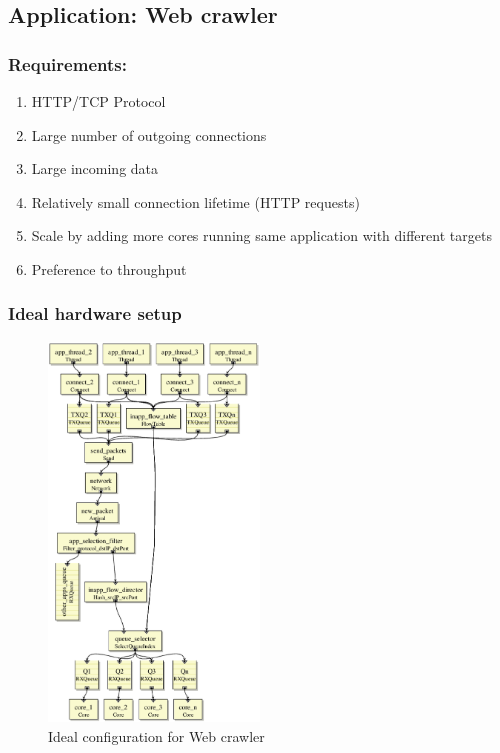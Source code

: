\subsection{Application: Web crawler}

\subsubsection{Requirements:}
\begin{enumerate}
    \item HTTP/TCP Protocol
    \item Large number of outgoing connections
    \item Large incoming data
    \item Relatively small connection lifetime (HTTP requests)
    \item Scale by adding more cores running same application with different
        targets
    \item Preference to throughput
\end{enumerate}

\subsubsection{Ideal hardware setup}

\begin{figure}[t]
\centering
\includegraphics[width=0.5\textwidth]{figures/WebCrawlerIdeal.eps}
\caption{Ideal configuration for Web crawler}
\end{figure}

